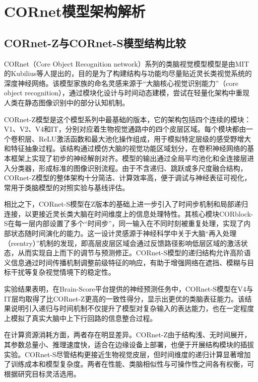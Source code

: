 \section{CORnet模型架构解析}

\subsection{CORnet-Z与CORnet-S模型结构比较}

CORnet（Core Object Recognition network）系列的类脑视觉模型模型是由MIT的Kubilius等人提出的，目的是为了构建结构与功能均尽量贴近灵长类视觉系统的深度神经网络。该模型家族的命名灵感来源于“大脑核心视觉识别能力”（core object recognition），通过模块化设计与时间动态建模，尝试在轻量化架构中重现人类在静态图像识别中的部分认知机制\cite{kubilius2019brain}。

CORnet-Z模型是这个模型系列中最基础的版本，它的架构包括四个连续的模块：V1、V2、V4和IT，分别对应着生物视觉通路中的四个皮层区域。每个模块都由一个卷积层、ReLU激活函数和最大池化操作组成，用于模拟特定层级的感受野增大和特征抽象过程。该结构通过模仿大脑的视觉功能区域划分，在卷积神经网络的基本框架上实现了初步的神经解剖对齐。模型的输出通过全局平均池化和全连接层进入分类器，形成标准的图像识别流程。由于不含递归、跳跃或多尺度融合结构，CORnet-Z模型的整体架构十分简洁、计算效率高，便于调试与神经表征可视化，常用于类脑模型的对照实验与基线评估。

相比之下，CORnet-S模型在Z版本的基础上进一步引入了时间步机制和局部递归连接，以更接近灵长类大脑在时间维度上的信息处理特性。其核心模块CORblock-S在每一层内部设置了多个“时间步”，同一输入在不同时刻被重复处理，实现了内部状态随时间演化的能力。这一设计灵感源于神经科学中关于大脑“再入处理（reentry）”机制的发现，即高层皮层区域会通过反馈路径影响低层区域的激活状态，从而实现自上而下的调节与预测修正\cite{kar2019evidence}。CORnet-S模型的递归结构允许高阶语义信息通过时间传播机制调整前级特征的响应，有助于增强网络在遮挡、模糊与目标干扰等复杂视觉情境下的稳定性。

实验结果表明，在Brain-Score平台提供的神经预测任务中，CORnet-S模型在V4与IT层均取得了比CORnet-Z更高的一致性得分，显示出更优的类脑表征能力\cite{kubilius2019brain}。该结果说明引入递归与时间机制不仅提升了模型对复杂输入的表达能力，也在一定程度上模拟了真实大脑中上下行回路的信息整合过程。

在计算资源消耗方面，两者存在明显差异。CORnet-Z由于结构浅、无时间展开，其参数总量小、推理速度快，适合在边缘设备上部署，也便于开展结构模块的插拔实验。CORnet-S尽管结构更接近生物视觉皮层，但时间维度的递归计算显著增加了训练成本和模型复杂度。两者在性能、类脑相似性与可操作性之间各有权衡，可根据研究目标灵活选用。

